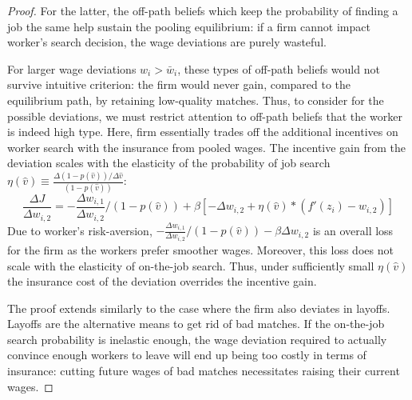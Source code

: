 \begin{proof}
    For the latter, the off-path beliefs which keep the probability of finding a job the same help sustain the pooling equilibrium: if a firm cannot impact worker's search decision, the wage deviations are purely wasteful.

    For larger wage deviations $w_i>\bar{w}_i$, these types of off-path beliefs would not survive intuitive criterion: the firm would never gain, compared to the equilibrium path, by retaining low-quality matches. Thus, to consider for the possible deviations, we must restrict attention to off-path beliefs that the worker is indeed high type. Here, firm essentially trades off the additional incentives on worker search with the insurance from pooled wages. The incentive gain from the deviation scales with the elasticity of the probability of job search $\eta(\hat{v})\equiv\frac{\Delta (1-p(\hat{v})) /\Delta \hat{v}}{(1-p(\hat{v}))}$:
    \[ \frac{\Delta J}{\Delta w_{i,2}} = -\frac{\Delta w_{i,1}}{\Delta w_{i,2}}/(1-p(\hat{v})) + \beta [-\Delta w_{i,2}+\eta(\hat{v}) * (f'(z_i)-w_{i,2})]\]
    Due to worker's risk-aversion, $-\frac{\Delta w_{i,1}}{\Delta w_{i,2}}/(1-p(\hat{v}))-\beta\Delta w_{i,2}$ is an overall loss for the firm as the workers prefer smoother wages. Moreover, this loss does not scale with the elasticity of on-the-job search. Thus, under sufficiently small $\eta(\hat{v})$ the insurance cost of the deviation overrides the incentive gain.

    The proof extends similarly to the case where the firm also deviates in layoffs. Layoffs are the alternative means to get rid of bad matches. If the on-the-job search probability is inelastic enough, the wage deviation required to actually convince enough workers to leave will end up being too costly in terms of insurance: cutting future wages of bad matches necessitates raising their current wages. 
    
\end{proof}

